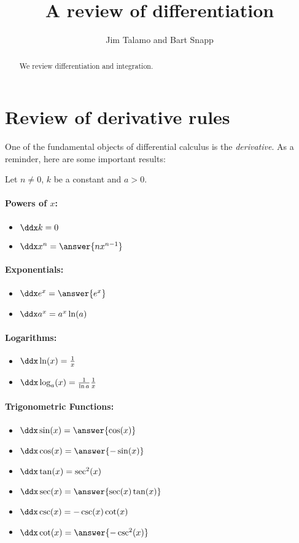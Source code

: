 \documentclass[nooutcomes]{ximera}
\author{Jim Talamo and Bart Snapp}
\title[Dig-In:]{A review of differentiation}
\begin{document}
\begin{abstract}
  We review differentiation and integration.
\end{abstract}
\maketitle


\section{Review of derivative rules}

One of the fundamental objects of differential calculus is the \emph{derivative}.  As a reminder, here are some important results:

  Let $n\ne 0$, $k$ be a constant and $a>0$.


\paragraph{Powers of $x$:}
\begin{itemize}
\item $\ddx k =0$
\item $\ddx x^n  = \answer{n x^{n-1}}$
\end{itemize}

\paragraph{Exponentials:}
\begin{itemize}
\item $\ddx e^x = \answer{e^x}$
\item $\ddx a^x = a^x\ln(a)$
\end{itemize}

\paragraph{Logarithms:}
\begin{itemize}
\item $\ddx \ln(x) = \frac{1}{x}$
\item $\ddx \log_a (x) = \frac{1}{\ln a} \frac{1}{x}$
\end{itemize}

\paragraph{Trigonometric Functions:}
\begin{itemize}
\item $\ddx \sin(x) = \answer{\cos(x)}$
\item $\ddx \cos(x) = \answer{-\sin(x)}$  
\item $\ddx \tan(x) = \sec^2(x)$  
\item $\ddx \sec(x) = \answer{\sec(x)\tan(x)}$ 
\item $\ddx \csc(x) = -\csc(x)\cot(x)$
\item $\ddx \cot(x) = \answer{-\csc^2(x)}$
\end{itemize}
\end{document}

